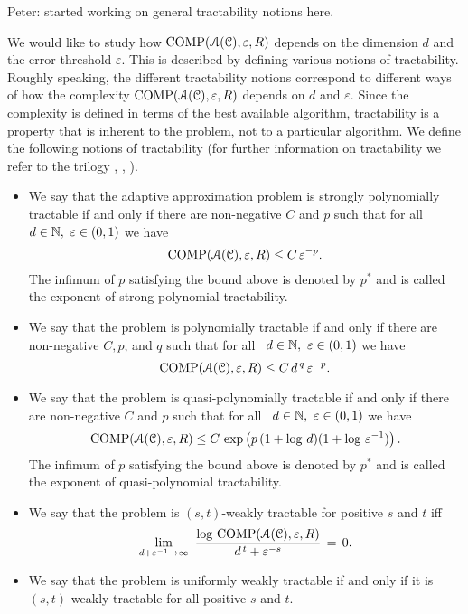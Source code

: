 \documentclass[USenglish]{article}
\DeclareMathOperator{\COMP}{COMP}
\newcommand{\PeterNote}[1]{{\color{orange}Peter: #1}}
\begin{document}
\PeterNote{started working on general tractability notions here.

\bigskip

We would like to study how $\COMP(\calA(\calC), \varepsilon,R)$ 
depends on the dimension $d$ and the error threshold $\varepsilon$. This is described by defining various notions of tractability. Roughly speaking, the different tractability notions correspond to different 
ways of how the complexity $\COMP(\calA(\calC), \varepsilon,R)$ depends on $d$ and $\varepsilon$. Since 
the complexity is defined in terms of the best available algorithm, tractability is a property that is inherent 
to the problem, not to a particular algorithm. 
We define the following notions of tractability (for further information on tractability we refer to the trilogy 
\cite{NovWoz08a}, \cite{NovWoz10a}, \cite{NovWoz12a}). 

\begin{itemize}   
\item We say that the adaptive approximation problem is strongly polynomially tractable
if and only if there are non-negative $C$ and $p$ such that   
for all \ $d\in{\mathbb{N}},\ \varepsilon\in (0,1)$ we have   
$$   
\COMP(\calA(\calC), \varepsilon,R)\le C\,\varepsilon^{-p}.
$$   
The infimum of $p$ satisfying the bound above is denoted by $p^*$   
and is called the exponent of strong polynomial tractability.    
\newline \qquad   

\item    
We say that the problem is polynomially tractable
if and only if there are non-negative $C,p$, and $q$ such that   
for all \ $d\in{\mathbb{N}},\ \varepsilon\in (0,1)$ we have   
$$   
\COMP(\calA(\calC), \varepsilon,R)\le C\,d^{\,q}\,   
\varepsilon^{-p}.   
$$   
\vskip 0.5pc     
\item   
We say that the problem is quasi-polynomially tractable if and only if there are non-negative $C$ and $p$ such that   
for all \ $d\in{\mathbb{N}},\ \varepsilon\in (0,1)$ we have    
$$   
\COMP(\calA(\calC), \varepsilon,R)\le   
C\,\exp\left(p\,(1+\log\,d)(1+\log\,\varepsilon^{-1})\right).   
$$    
The infimum of $p$ satisfying the bound above is denoted by $p^*$   
and is called the exponent of quasi-polynomial tractability.    
\newline \qquad   
   
\item   
We say that the problem is $(s,t)$-weakly tractable for positive $s$ and $t$ iff    
$$   
\lim_{d+\varepsilon^{-1}\to\infty}\   
\frac{\log\, \COMP(\calA(\calC), \varepsilon,R)}   
{d^{\,t}+\varepsilon^{-s}}\,=\,0.   
$$    
\newline \qquad   
  
\item    
We say that the problem is uniformly weakly tractable if and only if it 
is $(s,t)$-weakly tractable for all positive $s$ and $t$.    
\end{itemize}   


}
\end{document}
